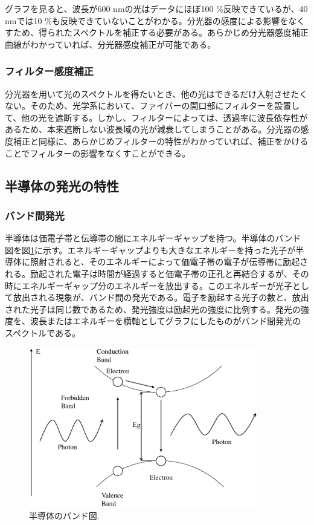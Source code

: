 \documentclass[11pt,a4j]{jsarticle}
\begin{document}
グラフを見ると、波長が600 nmの光はデータにほぼ100 \%反映できているが、40 nmでは10 \%も反映できていないことがわかる。分光器の感度による影響をなくすため、得られたスペクトルを補正する必要がある。あらかじめ分光器感度補正曲線がわかっていれば、分光器感度補正が可能である。

\subsubsection{フィルター感度補正}

分光器を用いて光のスペクトルを得たいとき、他の光はできるだけ入射させたくない。そのため、光学系において、ファイバーの開口部にフィルターを設置して、他の光を遮断する。しかし、フィルターによっては、透過率に波長依存性があるため、本来遮断しない波長域の光が減衰してしまうことがある。分光器の感度補正と同様に、あらかじめフィルターの特性がわかっていれば、補正をかけることでフィルターの影響をなくすことができる。

\newpage
\subsection{半導体の発光の特性}

\subsubsection{バンド間発光}
半導体は価電子帯と伝導帯の間にエネルギーギャップを持つ。半導体のバンド図を図\ref{fig_band1}に示す。エネルギーギャップよりも大きなエネルギーを持った光子が半導体に照射されると、そのエネルギーによって価電子帯の電子が伝導帯に励起される。励起された電子は時間が経過すると価電子帯の正孔と再結合するが、その時にエネルギーギャップ分のエネルギーを放出する。このエネルギーが光子として放出される現象が、バンド間の発光である。電子を励起する光子の数と、放出された光子は同じ数であるため、発光強度は励起光の強度に比例する。発光の強度を、波長またはエネルギーを横軸としてグラフにしたものがバンド間発光のスペクトルである。%

\begin{figure}[h]
 \centering
 \includegraphics[clip,width=10cm]{start_semiconductor.eps}
 \caption{半導体のバンド図.}
 \label{fig_band1}
\end{figure}
\end{document}
